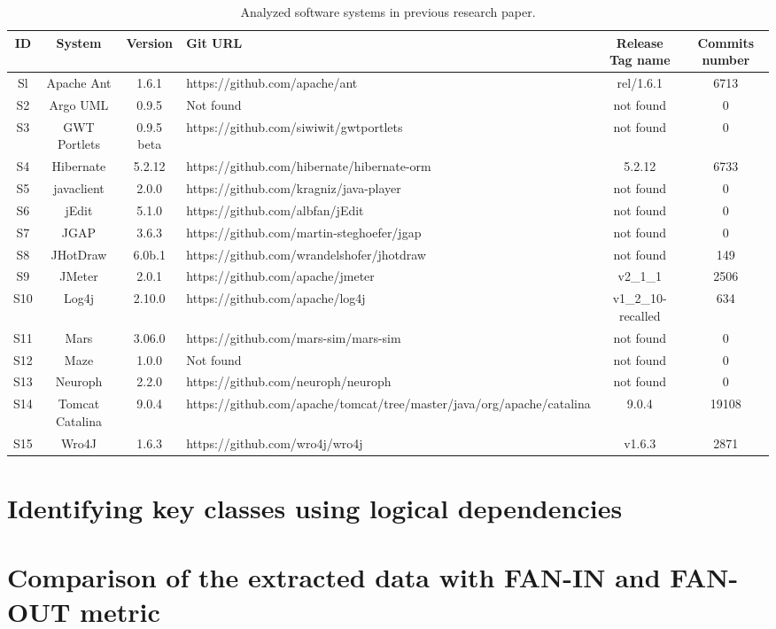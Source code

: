 \documentclass[12pt]{mitthesis}
\begin{document}
\begin{table}[H]
\renewcommand{\arraystretch}{1}
\caption{Analyzed software systems in previous research paper.}
\label{tab:gitfoundsystems}
\centering
\begin{tabular}{|c|c|c|L|c|c|}
\hline
ID	&	System	&	Version	&	Git URL	&	Release Tag name	&	Commits number	\\
\hline
Sl	&	Apache Ant	&	1.6.1	&	https://github.com/apache/ant	&	rel/1.6.1	&	6713	\\
S2	&	Argo UML	&	0.9.5	&	Not found	&	not found	&	0	\\
S3	&	GWT Portlets	&	0.9.5 beta	&	https://github.com/siwiwit/gwtportlets	&	not found	&	0	\\
S4	&	Hibernate 	&	5.2.12	&	https://github.com/hibernate/hibernate-orm	&	5.2.12	&	6733	\\
S5	&	javaclient	&	2.0.0	&	https://github.com/kragniz/java-player	&	not found	&	0	\\
S6	&	jEdit	&	5.1.0	&	https://github.com/albfan/jEdit	&	not found	&	0	\\
S7	&	JGAP	&	3.6.3	&	https://github.com/martin-steghoefer/jgap	&	not found	&	0	\\
S8	&	JHotDraw	&	6.0b.1	&	https://github.com/wrandelshofer/jhotdraw	&	not found	&	149	\\
S9	&	JMeter	&	2.0.1	&	https://github.com/apache/jmeter	&	v2_1_1	&	2506	\\
S10	&	Log4j	&	2.10.0	&	https://github.com/apache/log4j	&	v1_2_10-recalled	&	634	\\
S11	&	Mars	&	3.06.0	&	https://github.com/mars-sim/mars-sim	&	not found	&	0	\\
S12	&	Maze	&	1.0.0	&	Not found	&	not found	&	0	\\
S13	&	Neuroph	&	2.2.0	&	https://github.com/neuroph/neuroph	&	not found	&	0	\\
S14	&	Tomcat Catalina	&	9.0.4	&	https://github.com/apache/tomcat/tree/master/java/org/apache/catalina	&	9.0.4	&	19108	\\
S15	&	Wro4J	&	1.6.3	&	https://github.com/wro4j/wro4j	&	v1.6.3	&	2871	\\
\hline
\end{tabular}
\end{table}


\section{Identifying key classes using logical dependencies}

\section{Comparison of the extracted data with FAN-IN and FAN-OUT metric}






\end{document}
